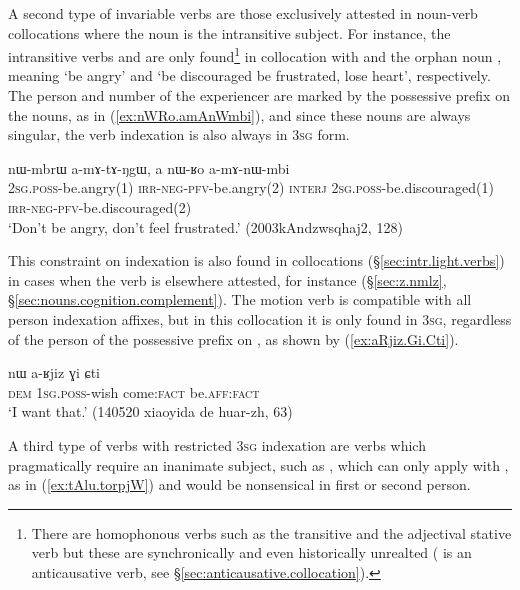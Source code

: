 A second type of invariable verbs are those exclusively attested in noun-verb collocations where the noun is the intransitive subject. For instance, the intransitive verbs  and  are only found\footnote{There are homophonous verbs such as the transitive  and the adjectival stative verb  but these are synchronically and even historically unrealted ( is an anticausative verb, see §\ref{sec:anticausative.collocation}).  } in collocation with  and the orphan noun , meaning `be angry' and `be discouraged be frustrated, lose heart', respectively. The person and number of the experiencer are marked by the possessive prefix on the nouns, as in (\ref{ex:nWRo.amAnWmbi}), and since these nouns are always singular, the verb indexation is also always in \textsc{3sg} form.

\begin{exe}
\ex   \label{ex:nWRo.amAnWmbi}
\gll  nɯ-mbrɯ a-mɤ-tɤ-ŋgɯ, a nɯ-ʁo a-mɤ-nɯ-mbi \\
\textsc{2sg}.\textsc{poss}-be.angry(1) \textsc{irr}-\textsc{neg}-\textsc{pfv}-be.angry(2) \textsc{interj} \textsc{2sg}.\textsc{poss}-be.discouraged(1) \textsc{irr}-\textsc{neg}-\textsc{pfv}-be.discouraged(2)  \\
\glt `Don't be angry, don't feel frustrated.' (2003kAndzwsqhaj2, 128)
\end{exe}

This constraint on indexation is also found in collocations (§\ref{sec:intr.light.verbs}) in cases when the verb is elsewhere attested, for instance  (§\ref{sec:z.nmlz}, §\ref{sec:nouns.cognition.complement}). The motion verb  is compatible with all person indexation affixes, but in this collocation it is only found in \textsc{3sg}, regardless of the person of the possessive prefix on , as shown by (\ref{ex:aRjiz.Gi.Cti}).

\begin{exe}
\ex   \label{ex:aRjiz.Gi.Cti}
\gll   nɯ a-ʁjiz ɣi ɕti \\
\textsc{dem} \textsc{1sg}.\textsc{poss}-wish come:\textsc{fact} be.\textsc{aff}:\textsc{fact} \\
\glt `I want that.' (140520 xiaoyida de huar-zh, 63)
\end{exe}

A third type of verbs with restricted \textsc{3sg} indexation are verbs which pragmatically require an inanimate subject, such as , which can only apply with , as in (\ref{ex:tAlu.torpjW}) and would be nonsensical in first or second person.

